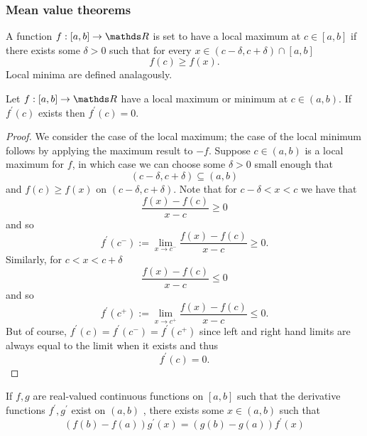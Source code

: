 \subsubsection{Mean value theorems}
\begin{defn}
	\label{def:localMax}A function $f:\left[a,b\right]\to\R$ is set
	to have a local maximum at $c\in\left[a,b\right]$ if there exists
	some $\delta>0$ such that for every $x\in\left(c-\delta,c+\delta\right)\cap\left[a,b\right]$
	\[
	f\left(c\right)\geq f\left(x\right).
	\]
	Local minima are defined analagously.
\end{defn}

\begin{prop}
	\label{prop:firstOrderConditionR}Let $f:\left[a,b\right]\to\R$ have
	a local maximum or minimum at $c\in\left(a,b\right).$ If $f^{\prime}\left(c\right)$
	exists then $f^{\prime}\left(c\right)=0.$
\end{prop}

\begin{proof}
	We consider the case of the local maximum; the case of the local minimum
	follows by applying the maximum result to $-f.$ Suppose $c\in\left(a,b\right)$
	is a local maximum for $f$, in which case we can choose some $\delta>0$
	small enough that 
	\[
	\left(c-\delta,c+\delta\right)\subseteq\left(a,b\right)
	\]
	and $f\left(c\right)\geq f\left(x\right)$ on $\left(c-\delta,c+\delta\right).$
	Note that for $c-\delta<x<c$ we have that 
	\[
	\frac{f\left(x\right)-f\left(c\right)}{x-c}\geq0
	\]
	and so 
	\[
	f^{\prime}\left(c^{-}\right):=\lim_{x\to c^{-}}\frac{f\left(x\right)-f\left(c\right)}{x-c}\geq0.
	\]
	Similarly, for $c<x<c+\delta$
	\[
	\frac{f\left(x\right)-f\left(c\right)}{x-c}\leq0
	\]
	and so 
	\[
	f^{\prime}\left(c^{+}\right):=\lim_{x\to c^{+}}\frac{f\left(x\right)-f\left(c\right)}{x-c}\leq0.
	\]
	But of course, $f^{\prime}\left(c\right)=f^{\prime}\left(c^{-}\right)=f^{\prime}\left(c^{+}\right)$
	since left and right hand limits are always equal to the limit when
	it exists and thus 
	\[
	f^{\prime}\left(c\right)=0.
	\]
\end{proof}
\begin{thm}
	\label{thm:cauchyMeanValue}If $f,g$ are real-valued continuous
	functions on $\left[a,b\right]$ such that the derivative functions
	$f^{\prime},g^{\prime}$ exist on $\left(a,b\right)$ , there exists
	some $x\in\left(a,b\right)$ such that 
	\[
	\left(f\left(b\right)-f\left(a\right)\right)g^{\prime}\left(x\right)=\left(g\left(b\right)-g\left(a\right)\right)f^{\prime}\left(x\right)
	\]
\end{thm}

